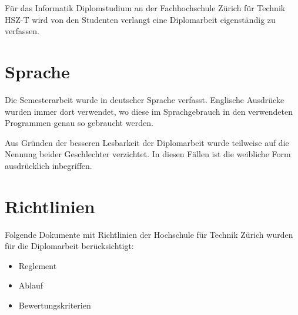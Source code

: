 Für das Informatik Diplomstudium an der Fachhochschule Zürich für Technik
HSZ-T wird von den Studenten verlangt eine Diplomarbeit eigenständig zu
verfassen.

\section{Sprache}
Die Semesterarbeit wurde in deutscher Sprache verfasst. Englische Ausdrücke 
wurden immer dort verwendet, wo diese im Sprachgebrauch in den verwendeten 
Programmen genau so gebraucht werden.

Aus Gründen der besseren Lesbarkeit der Diplomarbeit wurde teilweise auf 
die Nennung beider Geschlechter verzichtet. In diesen Fällen ist die 
weibliche Form ausdrücklich inbegriffen.
  
\section{Richtlinien}
Folgende Dokumente mit Richtlinien der Hochschule für Technik Zürich 
wurden für die Diplomarbeit berücksichtigt:

\begin{itemize}
    \item Reglement \cite{hsz_reglement}
    \item Ablauf \cite{hsz_ablauf}
    \item Bewertungskriterien \cite{hsz_bewertungskriterien}
\end{itemize}
